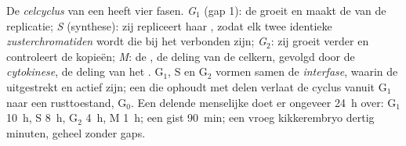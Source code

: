 \begin{definition}[De celcyclus]\label{def:b1:replication-mitosis:cycle}
De \emph{celcyclus} van een  heeft vier fasen. \emph{G$_1$} (gap 1):
de  groeit en maakt de  van de replicatie; \emph{S} (synthese): zij
repliceert haar , zodat elk  twee identieke \emph{zusterchromatiden}
wordt die bij het  verbonden zijn; \emph{G$_2$}: zij groeit verder en
controleert de kopieën; \emph{M}: de \emph{}, de deling van de celkern,
gevolgd door de \emph{cytokinese}, de deling van het . G$_1$, S en G$_2$
vormen samen de \emph{interfase}, waarin de  uitgestrekt en actief zijn;
een  die ophoudt met delen verlaat de cyclus vanuit G$_1$ naar een rusttoestand,
G$_0$. Een delende menselijke  doet er ongeveer \qty{24}{h} over: G$_1$
\qty{10}{h}, S \qty{8}{h}, G$_2$ \qty{4}{h}, M \qty{1}{h}; een gist \qty{90}{min};
een vroeg kikkerembryo dertig minuten, geheel zonder gaps.
\end{definition}

